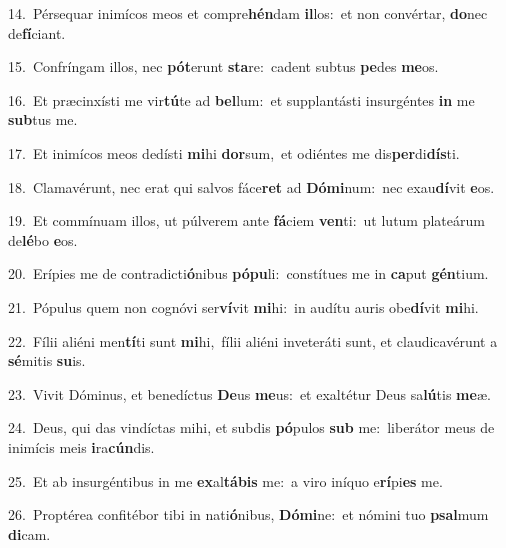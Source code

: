 {\numbfont\textcolor{\numbcolor}{14.}}~Pérsequar inimícos meos et compre\-\textbf{hén}\-dam \textbf{il}\-los:~\star et non convértar, \textbf{do}\-nec de\-\textbf{fí}\-ciant.\par
{\numbfont\textcolor{\numbcolor}{15.}}~Confríngam illos, nec \textbf{pót}\-erunt \textbf{sta}\-re:~\star cadent subtus \textbf{pe}\-des \textbf{me}\-os.\par
{\numbfont\textcolor{\numbcolor}{16.}}~Et præcinxísti me vir\-\textbf{tú}\-te ad \textbf{bel}\-lum:~\star et supplantásti insurgéntes \textbf{in} me \textbf{sub}\-tus me.\par
{\numbfont\textcolor{\numbcolor}{17.}}~Et inimícos meos dedísti \textbf{mi}\-hi \textbf{dor}\-sum,~\star et odiéntes me dis\-\textbf{per}\-di\-\textbf{dís}\-ti.\par
{\numbfont\textcolor{\numbcolor}{18.}}~Clamavérunt, nec erat qui salvos fáce\textbf{ret} ad \textbf{Dó}\-\textbf{mi}num:~\star nec exau\-\textbf{dí}\-vit \textbf{e}\-os.\par
{\numbfont\textcolor{\numbcolor}{19.}}~Et commínuam illos, ut púlverem ante \textbf{fá}\-ciem \textbf{ven}\-ti:~\star ut lutum plateárum de\-\textbf{lé}\-bo \textbf{e}\-os.\par
{\numbfont\textcolor{\numbcolor}{20.}}~Erípies me de contradicti\-\textbf{ó}\-nibus \textbf{pó}\-\textbf{pu}li:~\star constítues me in \textbf{ca}\-put \textbf{gén}\-tium.\par
{\numbfont\textcolor{\numbcolor}{21.}}~Pópulus quem non cognóvi ser\-\textbf{ví}\-vit \textbf{mi}\-hi:~\star in audítu auris obe\-\textbf{dí}\-vit \textbf{mi}\-hi.\par
{\numbfont\textcolor{\numbcolor}{22.}}~Fílii aliéni men\-\textbf{tí}\-ti sunt \textbf{mi}\-hi,~\star fílii aliéni inveteráti sunt, et claudicavérunt a \textbf{sé}\-mitis \textbf{su}\-is.\par
{\numbfont\textcolor{\numbcolor}{23.}}~Vivit Dóminus, et benedíctus \textbf{De}\-us \textbf{me}\-us:~\star et exaltétur Deus sa\-\textbf{lú}\-tis \textbf{me}\-æ.\par
{\numbfont\textcolor{\numbcolor}{24.}}~Deus, qui das vindíctas mihi, et subdis \textbf{pó}\-pulos \textbf{sub} me:~\star liberátor meus de inimícis meis \textbf{i}\-ra\-\textbf{cún}\-dis.\par
{\numbfont\textcolor{\numbcolor}{25.}}~Et ab insurgéntibus in me \textbf{ex}\-al\-\textbf{tá}\-\textbf{bis} me:~\star a viro iníquo e\-\textbf{rí}\-pi\textbf{es} me.\par
{\numbfont\textcolor{\numbcolor}{26.}}~Proptérea confitébor tibi in nati\-\textbf{ó}\-nibus, \textbf{Dó}\-\textbf{mi}ne:~\star et nómini tuo \textbf{psal}\-mum \textbf{di}\-cam.\par
